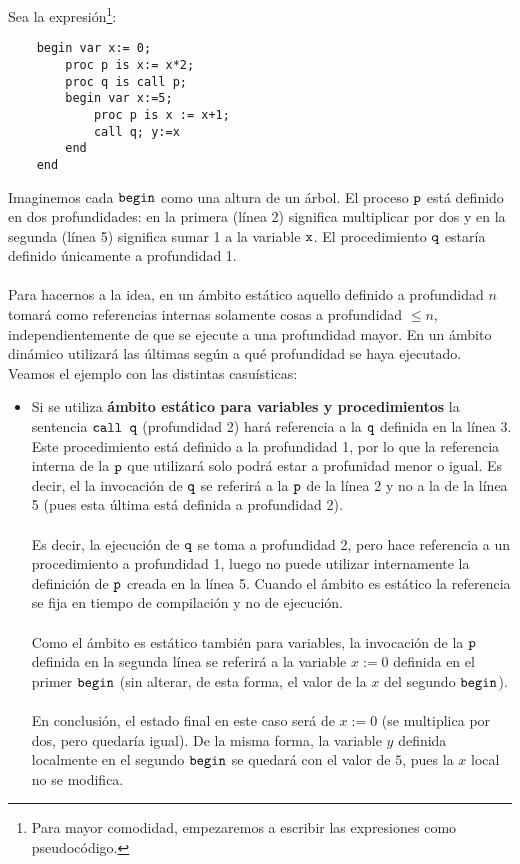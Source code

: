 \begin{example}
Sea la expresión\footnote{Para mayor comodidad, empezaremos a escribir las expresiones como pseudocódigo.}:
\begin{verbatim}
    begin var x:= 0;
        proc p is x:= x*2;
        proc q is call p;
        begin var x:=5;
            proc p is x := x+1;
            call q; y:=x
        end
    end
\end{verbatim}
Imaginemos cada $\texttt{begin}$ como una altura de un árbol. El proceso $\texttt{p}$ está definido en dos profundidades: en la primera (línea 2) significa multiplicar por dos y en la segunda (línea 5) significa sumar 1 a la variable $\texttt{x}$. El procedimiento $\texttt{q}$ estaría definido únicamente a profundidad 1. \\ \\
Para hacernos a la idea, en un ámbito estático aquello definido a profundidad $n$ tomará como referencias internas solamente cosas a profundidad $\leq n$, independientemente de que se ejecute a una profundidad mayor. En un ámbito dinámico utilizará las últimas según a qué profundidad se haya ejecutado. Veamos el ejemplo con las distintas casuísticas:
\begin{itemize}
    \item Si se utiliza \textbf{ámbito estático para variables y procedimientos} la sentencia $\texttt{call q}$ (profundidad 2) hará referencia a la $\texttt{q}$ definida en la línea 3. Este procedimiento está definido a la profundidad 1, por lo que la referencia interna de la $\texttt{p}$ que utilizará solo podrá estar a profunidad menor o igual. Es decir, el la invocación de $\texttt{q}$ se referirá a la $\texttt{p}$ de la línea 2 y no a la de la línea 5 (pues esta última está definida a profundidad 2). \\ \\
    Es decir, la ejecución de $\texttt{q}$ se toma a profundidad 2, pero hace referencia a un procedimiento a profundidad 1, luego no puede utilizar internamente la definición de $\texttt{p}$ creada en la línea 5. Cuando el ámbito es estático la referencia se fija en tiempo de compilación y no de ejecución. \\ \\
    Como el ámbito es estático también para variables, la invocación de la $\texttt{p}$ definida en la segunda línea se referirá a la variable $x:=0$ definida en el primer $\texttt{begin}$ (sin alterar, de esta forma, el valor de la $x$ del segundo $\texttt{begin}$). \\ \\
    En conclusión, el estado final en este caso será de $x:=0$ (se multiplica por dos, pero quedaría igual). De la misma forma, la variable $y$ definida localmente en el segundo $\texttt{begin}$ se quedará con el valor de $5$, pues la $x$ local no se modifica.

\end{itemize}
\end{example}
